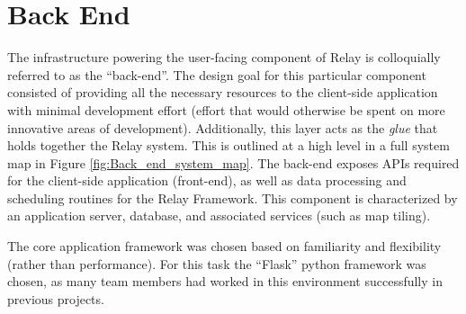 \documentclass{report}
\begin{document}
\section{Back End}
The infrastructure powering the user-facing component of Relay is colloquially referred to as the ``back-end''.
The design goal for this particular component consisted of providing all the necessary resources to the client-side application with minimal development effort (effort that would otherwise be spent on more innovative areas of development).
Additionally, this layer acts as the \emph{glue} that holds together the Relay system.
This is outlined at a high level in a full system map in Figure \ref{fig:Back_end_system_map}.
The back-end exposes APIs required for the client-side application (front-end), as well as data processing and scheduling routines for the Relay Framework.
This component is characterized by an application server, database, and associated services (such as map tiling).

The core application framework was chosen based on familiarity and flexibility (rather than performance).
For this task the ``Flask'' python framework was chosen, as many team members had worked in this environment successfully in previous projects.
\end{document}
